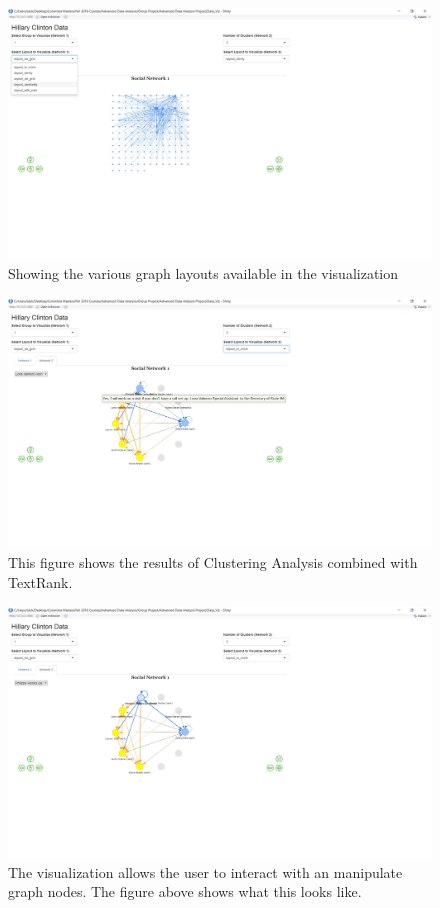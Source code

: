 \begin{figure}[ht]
	\includegraphics[width=\textwidth]{eric/Viz_Screenshot_2}
	\caption{Showing the various graph layouts available in the visualization}
	\label{Viz2}
\end{figure}

\begin{figure}[ht]
	\includegraphics[width=\textwidth]{eric/Viz_Screenshot_3}
	\caption{This figure shows the results of Clustering Analysis combined with TextRank.}
	\label{Viz3}
\end{figure}

\begin{figure}[ht]
	\includegraphics[width=\textwidth]{eric/Viz_Screenshot_4}
	\caption{The visualization allows the user to interact with an manipulate graph nodes. The figure above shows what this looks like.}
	\label{Viz4}
\end{figure}
